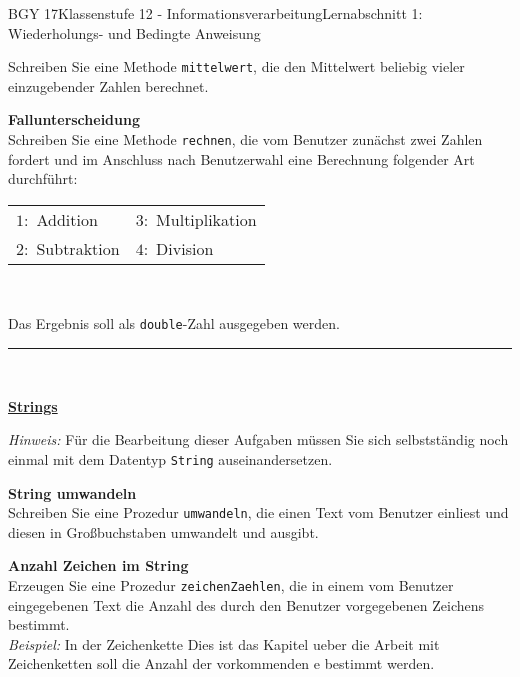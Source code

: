 \documentclass[oneside,openany,headings=optiontotoc,11pt,numbers=noenddot]{scrreprt}
\begin{document}
\begin{worksheet}{BGY 17}{Klassenstufe 12 - Informationsverarbeitung}{Lernabschnitt 1: Wiederholungs- und Bedingte Anweisung}
\begin{framed}
			Schreiben Sie eine Methode \lstinline[style=JavaInputStyle]|mittelwert|, die den Mittelwert beliebig vieler einzugebender Zahlen berechnet.\\
			\par\noindent
			\textbf{Fallunterscheidung}\\
			Schreiben Sie eine Methode \lstinline[style=JavaInputStyle]|rechnen|, die vom Benutzer zunächst zwei Zahlen fordert und im Anschluss nach Benutzerwahl eine Berechnung folgender Art durchführt:\\
			\par\noindent
			\begin{tabularx}{\textwidth}{ll}
				\(1:\) Addition & \(3:\) Multiplikation\\
				\(2:\) Subtraktion & \(4:\) Division
			\end{tabularx}\\
			\par\noindent
			Das Ergebnis soll als \lstinline[style=JavaInputStyle]|double|-Zahl ausgegeben werden.\\
						\par\noindent
			\rule{\textwidth}{0.1pt}\\
			\par\noindent
			\large{\textbf{\underline{Strings}}}\\
			\normalsize
			\par\noindent
			\textit{Hinweis:} Für die Bearbeitung dieser Aufgaben müssen Sie sich selbstständig noch einmal mit dem Datentyp \lstinline[style=JavaInputStyle]|String| auseinandersetzen.\\
			\par\noindent
			\textbf{String umwandeln}\\
			Schreiben Sie eine Prozedur \lstinline[style=JavaInputStyle]|umwandeln|, die einen Text vom Benutzer einliest und diesen in Großbuchstaben umwandelt und ausgibt.\\
			\par\noindent
			\textbf{Anzahl Zeichen im String}\\
			Erzeugen Sie eine Prozedur \lstinline[style=JavaInputStyle]|zeichenZaehlen|, die in einem vom Benutzer eingegebenen Text die Anzahl des durch den Benutzer vorgegebenen Zeichens bestimmt.\\
			\textit{Beispiel:} In der Zeichenkette \grqq{}Dies ist das Kapitel ueber die Arbeit mit Zeichenketten\grqq{} soll die Anzahl der vorkommenden \grq{}e\grq{} bestimmt werden.\\
			\par\noindent

\end{framed}
\end{worksheet}
\end{document}
